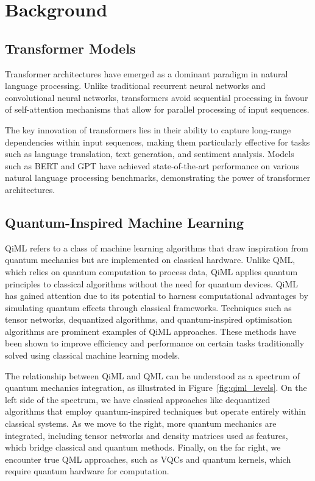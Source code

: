 \section{Background}
\label{sec:background}

\subsection{Transformer Models}
\label{subsec:transformer_models}
Transformer architectures have emerged as a dominant paradigm in
natural language processing. Unlike traditional recurrent neural
networks and convolutional neural networks, transformers avoid
sequential processing in favour of self-attention mechanisms that
allow for parallel processing of input sequences.

The key innovation of transformers lies in their ability to capture
long-range dependencies within input sequences, making them
particularly effective for tasks such as language translation, text
generation, and sentiment analysis. Models such as \gls{BERT} and
\gls{GPT} have achieved state-of-the-art performance on various
natural language processing benchmarks,
demonstrating the power of transformer architectures.

\subsection{Quantum-Inspired Machine Learning}
\label{subsec:quantum_inspired_machine_learning}

\gls{QiML} refers to a class of machine learning algorithms that draw
inspiration from quantum mechanics but are implemented on classical
hardware. Unlike \gls{QML}, which relies on quantum computation to
process data, \gls{QiML} applies quantum principles to classical
algorithms without the need for quantum devices. \gls{QiML} has
gained attention due to its potential to harness computational
advantages by simulating quantum effects through classical
frameworks. Techniques such as tensor networks, dequantized
algorithms, and quantum-inspired optimisation algorithms are
prominent examples of \gls{QiML} approaches. These methods have been
shown to improve efficiency and performance on certain tasks
traditionally solved using classical machine learning models.

The relationship between \gls{QiML} and \gls{QML} can be understood
as a spectrum of quantum mechanics integration, as illustrated in
Figure~\ref{fig:qiml_levels}. On the left side of the spectrum, we
have classical approaches
like dequantized algorithms that employ quantum-inspired techniques
but operate entirely within classical systems. As we move to the
right, more quantum mechanics are integrated, including tensor
networks and density matrices used as features, which bridge
classical and quantum methods. Finally, on the far right, we
encounter true \gls{QML} approaches, such as \glspl{VQC} and
quantum kernels, which require quantum hardware
for computation.

